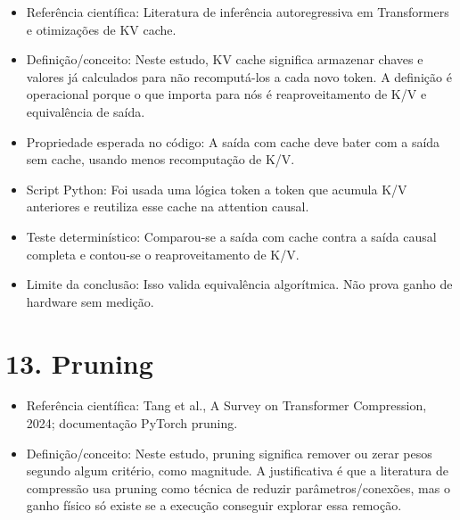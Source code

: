 \begin{itemize}
\item Referência científica:
Literatura de inferência autoregressiva em Transformers e otimizações de KV
cache.
\end{itemize}

\begin{itemize}
\item Definição/conceito:
Neste estudo, KV cache significa armazenar chaves e valores já calculados para
não recomputá-los a cada novo token. A definição é operacional porque o que
importa para nós é reaproveitamento de K/V e equivalência de saída.
\end{itemize}

\begin{itemize}
\item Propriedade esperada no código:
A saída com cache deve bater com a saída sem cache, usando menos recomputação
de K/V.
\end{itemize}

\begin{itemize}
\item Script Python:
Foi usada uma lógica token a token que acumula K/V anteriores e reutiliza esse
cache na attention causal.
\end{itemize}

\begin{itemize}
\item Teste determinístico:
Comparou-se a saída com cache contra a saída causal completa e contou-se o
reaproveitamento de K/V.
\end{itemize}

\begin{itemize}
\item Limite da conclusão:
Isso valida equivalência algorítmica. Não prova ganho de hardware sem medição.
\end{itemize}



\section{13. Pruning}


\begin{itemize}
\item Referência científica:
Tang et al., A Survey on Transformer Compression, 2024; documentação PyTorch
pruning.
\end{itemize}

\begin{itemize}
\item Definição/conceito:
Neste estudo, pruning significa remover ou zerar pesos segundo algum critério,
como magnitude. A justificativa é que a literatura de compressão usa pruning
como técnica de reduzir parâmetros/conexões, mas o ganho físico só existe se a
execução conseguir explorar essa remoção.
\end{itemize}

